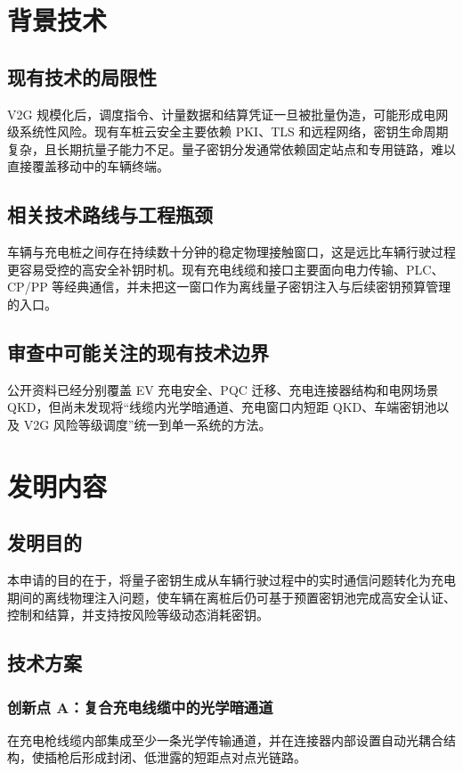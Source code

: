 ﻿\documentclass[12pt,a4paper]{article}
\begin{document}
\section{背景技术}
\subsection{现有技术的局限性}
V2G 规模化后，调度指令、计量数据和结算凭证一旦被批量伪造，可能形成电网级系统性风险。现有车桩云安全主要依赖 PKI、TLS 和远程网络，密钥生命周期复杂，且长期抗量子能力不足。量子密钥分发通常依赖固定站点和专用链路，难以直接覆盖移动中的车辆终端。

\subsection{相关技术路线与工程瓶颈}
车辆与充电桩之间存在持续数十分钟的稳定物理接触窗口，这是远比车辆行驶过程更容易受控的高安全补钥时机。现有充电线缆和接口主要面向电力传输、PLC、CP/PP 等经典通信，并未把这一窗口作为离线量子密钥注入与后续密钥预算管理的入口。

\subsection{审查中可能关注的现有技术边界}
公开资料已经分别覆盖 EV 充电安全、PQC 迁移、充电连接器结构和电网场景 QKD，但尚未发现将“线缆内光学暗通道、充电窗口内短距 QKD、车端密钥池以及 V2G 风险等级调度”统一到单一系统的方法。

\section{发明内容}
\subsection{发明目的}
本申请的目的在于，将量子密钥生成从车辆行驶过程中的实时通信问题转化为充电期间的离线物理注入问题，使车辆在离桩后仍可基于预置密钥池完成高安全认证、控制和结算，并支持按风险等级动态消耗密钥。

\subsection{技术方案}
\subsubsection{创新点 A：复合充电线缆中的光学暗通道}
在充电枪线缆内部集成至少一条光学传输通道，并在连接器内部设置自动光耦合结构，使插枪后形成封闭、低泄露的短距点对点光链路。
\end{document}
